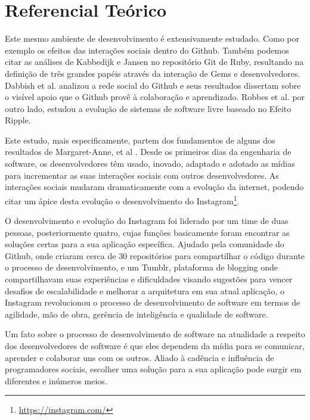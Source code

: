 \chapter{Referencial Teórico}

Este mesmo ambiente de desenvolvimento é extensivamente estudado. Como por exemplo os efeitos das interações sociais dentro do Github\cite{Syeed:2014:SCR:2641580.2641586}. Também podemos citar as análises de Kabbedijk e Jansen \cite{conf/icsob/KabbedijkJ11} no repositório Git de Ruby, resultando na definição de três grandes papéis através da interação de Gems e desenvolvedores. Dabbish et al. \cite{dabbish2012social} analizou a rede social do Github e seus resultados dissertam sobre o visível apoio que o Github provê à colaboração e aprendizado. Robbes et al. \cite{robbes2011study} por outro lado, estudou a evolução de sistemas de software livre baseado no Efeito Ripple.

Este estudo, mais especificamente, partem dos fundamentos de alguns dos resultados de Margaret-Anne, et al \cite{Storey:2014:ESM:2593882.2593887}. Desde os primeiros dias da engenharia de software, os desenvolvedores têm usado, inovado, adaptado e adotado as mídias para incrementar as suas interações sociais com outros desenvolvedores. As interações sociais mudaram dramaticamente com a evolução da internet, podendo citar um ápice desta evolução o desenvolvimento do Instagram\footnote{\url{https://instagram.com/}}.

O desenvolvimento e evolução do Instagram foi liderado por um time de duas pessoas, posteriormente quatro, cujas funções basicamente foram encontrar as soluções certas para a sua aplicação específica. Ajudado pela comunidade do Github, onde criaram cerca de 30 repositórios para compartilhar o código durante o processo de desenvolvimento, e um Tumblr, plataforma de blogging onde compartilhavam suas experiências e dificuldades visando sugestões para vencer desafios de escalabilidade e melhorar a arquitetura em sua atual aplicação, o Instagram revolucionou o processo de desenvolvimento de software em termos de agilidade, mão de obra, gerência de inteligência e qualidade de software.

Um fato sobre o processo de desenvolvimento de software na atualidade a respeito dos desenvolvedores de software é que eles dependem da mídia para se comunicar, aprender e colaborar uns com os outros. Aliado à cadência e influência de programadores sociais, escolher uma solução para a sua aplicação pode surgir em diferentes e inúmeros meios.

